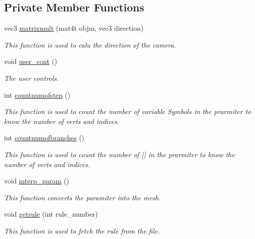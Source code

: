 \subsection*{Private Member Functions}
\begin{DoxyCompactItemize}
\item 
vec3 \hyperlink{classoctet_1_1_maths___l___systems_ad5454ccdf6a5def2e7ff79ea0a729117}{matrixmult} (mat4t objm, vec3 direction)
\begin{DoxyCompactList}\small\item\em This function is used to calu the direction of the camera. \end{DoxyCompactList}\item 
void \hyperlink{classoctet_1_1_maths___l___systems_a738c24b3bbd3bc31d9956eba83bcf90b}{user\+\_\+cont} ()
\begin{DoxyCompactList}\small\item\em The user controls. \end{DoxyCompactList}\item 
int \hyperlink{classoctet_1_1_maths___l___systems_ab9f480dfa7b0201bd097df12d02969ca}{countnumofstep} ()
\begin{DoxyCompactList}\small\item\em This function is used to count the number of variable Symbols in the prarmiter to know the number of verts and indices. \end{DoxyCompactList}\item 
int \hyperlink{classoctet_1_1_maths___l___systems_aa34870a929d313d545957a6845f82a73}{countnumofbranches} ()
\begin{DoxyCompactList}\small\item\em This function is used to count the number of \mbox{[}\mbox{]} in the prarmiter to know the number of verts and indices. \end{DoxyCompactList}\item 
void \hyperlink{classoctet_1_1_maths___l___systems_a3b6f86a6edb2b7728eafb97f6b12a6b9}{interp\+\_\+param} ()
\begin{DoxyCompactList}\small\item\em This function converts the paramiter into the mesh. \end{DoxyCompactList}\item 
void \hyperlink{classoctet_1_1_maths___l___systems_a7e62b7c37a290a739db142859ab15292}{getrule} (int rule\+\_\+number)
\begin{DoxyCompactList}\small\item\em This function is used to fetch the rule from the file. \end{DoxyCompactList}\item 

\end{DoxyCompactItemize}
